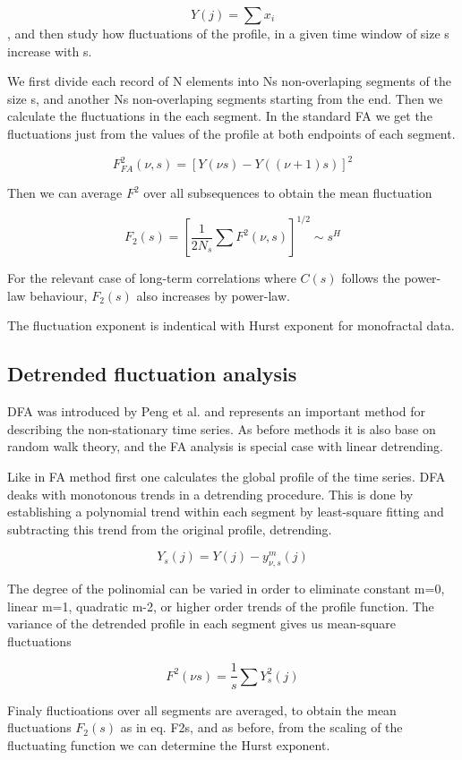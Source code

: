$$Y(j) = \sum x_i$$, 
and then study how fluctuations of the profile, in a given time window of size s increase with s. 

We first divide each record of N elements into Ns non-overlaping segments of the size s, and another Ns non-overlaping segments starting from the end. Then we calculate the fluctuations in the each segment. In the standard FA we get the fluctuations just from the values of the profile at both endpoints of each segment. 

$$ F_{FA}^2(\nu, s) = [Y(\nu s) - Y((\nu +1)s)]^2$$ 

Then we can average $F^2$ over all subsequences to obtain the mean fluctuation 

$$F_2(s) = [\frac{1}{2N_s} \sum F^2(\nu,s)]^{1/2}  \sim s^H$$

For the relevant case of long-term correlations where $C(s)$ follows the power-law behaviour, $F_2(s)$ also increases by power-law. 

The fluctuation exponent is indentical with Hurst exponent for monofractal data. 

\subsection{Detrended fluctuation analysis}

DFA was introduced by Peng et al. and represents an important method for describing the non-stationary time series. As before methods it is also base on random walk theory, and the FA analysis is special case with linear detrending. 

Like in FA method first one calculates the global profile of the time series. DFA deaks with monotonous trends in a detrending procedure. This is done by establishing a polynomial trend within each segment by least-square fitting and subtracting this trend from the original profile, detrending. 

$$Y_s(j) = Y(j) - y_{\nu ,s}^{m}(j)$$

The degree of the polinomial can be varied in order to eliminate constant m=0, linear m=1, quadratic m-2, or higher order trends of the profile function. The variance of the detrended profile in each segment gives us mean-square fluctuations

$$F^2(\nu  s) = \frac{1}{s} \sum Y_s^2(j)$$

Finaly fluctioations over all segments are averaged, to obtain the mean fluctuations $F_2(s)$ as in eq. F2s, and as before, from the scaling of the fluctuating function we can determine the Hurst exponent. 

